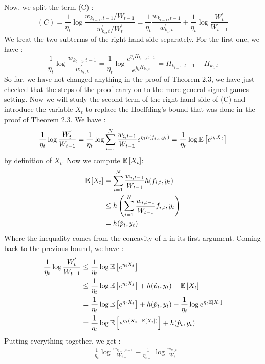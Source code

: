 \begin{solution}[]
Now, we split the term (C) :
\begin{equation*}
	(C) = \frac{1}{\eta_t}\log \frac{w_{k_{t-1},t-1}/W_{t-1}}{w^{'}_{k_t,t}/W^{'}_t} = \frac{1}{\eta_t} \frac{w_{k_{t-1},t-1}}{w^{'}_{k_t,t}} + \frac{1}{\eta_t} \log \frac{W^{'}_t}{W_{t-1}}
\end{equation*}
We treat the two subterms of the right-hand side separately. For the first one, we have :
\begin{equation*}
	\frac{1}{\eta_t} \log \frac{w_{k_{t-1},t-1}}{w^{'}_{k_t,t}} = \frac{1}{\eta_t} \log \frac{e^{\eta_t H_{k_{t-1},t-1}}}{e^{\eta_t H_{k_t,t}}} = H_{k_{t-1},t-1} - H_{k_t,t}
\end{equation*}
So far, we have not changed anything in the proof of Theorem 2.3, we have just checked that the steps of the proof carry on to the more general signed games setting. Now we will study the second term of the right-hand side of (C) and introduce the variable $ X_t $ to replace the Hoeffding's bound that was done in the proof of Theorem 2.3. We have :
\begin{equation*}
	\frac{1}{\eta_t} \log \frac{W^{'}_t}{W_{t-1}} = \frac{1}{\eta_t}\log \sum_{i=1}^{N} \frac{w_{i,t-1}}{W_{t-1}}e^{\eta_t h(f_{i,t},y_t)} = \frac{1}{\eta_t} \log \mathbb{E}\left[e^{\eta_tX_t}\right]
\end{equation*}
by definition of $ X_t $. 
Now we compute $ \mathbb{E}\left[X_t\right] $:
\begin{align*}
	\mathbb{E}\left[X_t\right] &= \sum_{i=1}^{N}\frac{w_{i,t-1}}{W_{t-1}}h(f_{i,t},y_t)\\
		 &\leq h \left( \sum_{i=1}^{N}\frac{w_{i,t-1}}{W_{t-1}}f_{i,t},y_t \right)\\
		 &=h(\hat{p}_t,y_t)
\end{align*}
Where the inequality comes from the concavity of h in its first argument.
Coming back to the previous bound, we have :
\begin{align*}
	\frac{1}{\eta_t}\log \frac{W^{'}_t}{W_{t-1}}&\leq \frac{1}{\eta_t}\log \mathbb{E}\left[e^{\eta_tX_t}\right]\\
	&\leq \frac{1}{\eta_t}\log \mathbb{E}\left[e^{\eta_tX_t}\right] + h(\hat{p}_t,y_t) - \mathbb{E}\left[X_t\right]\\
	&= \frac{1}{\eta_t}\log \mathbb{E}\left[e^{\eta_tX_t}\right] + h(\hat{p}_t,y_t) - \frac{1}{\eta_t}\log e^{\eta_t\mathbb{E}\left[X_t\right]}\\
	&= \frac{1}{\eta_t}\log \mathbb{E}\left[e^{\eta_t(X_t-\mathbb{E}\left[X_t\right])}\right] + h(\hat{p}_t,y_t)
\end{align*}
Putting everything together, we get :
\begin{align*}
	&\frac{1}{\eta_t} \log \frac{w_{k_{t-1},t-1}}{W_{t-1}} - \frac{1}{\eta_{t+1}}\log \frac{w_{k_t,t}}{W_t}\\

\end{align*}
\end{solution}
